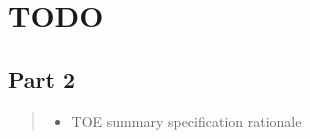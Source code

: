 \documentclass[12pt,english]{scrbook}
\begin{document}



\chapter{TODO}


\section{Part 2}
\begin{quote}
\begin{itemize}


\item {} 
TOE summary specification rationale

\end{itemize}
\end{quote}
\end{document}
